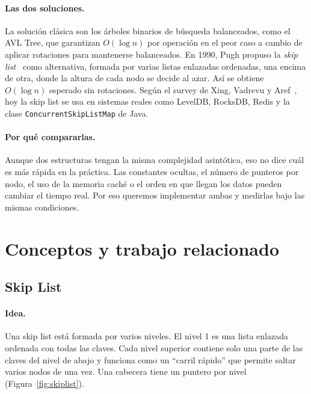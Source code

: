 \documentclass[11pt,a4paper]{article}
\begin{document}
\paragraph{Las dos soluciones.}
La solución clásica son los árboles binarios de búsqueda balanceados, como el
AVL Tree, que garantizan $O(\log n)$ por operación en el peor caso a cambio
de aplicar rotaciones para mantenerse balanceados. En 1990, Pugh propuso la
\emph{skip list}~\cite{pugh1990} como alternativa, formada por varias listas
enlazadas ordenadas, una encima de otra, donde la altura de cada nodo se decide
al azar. Así se obtiene $O(\log n)$ esperado sin rotaciones. Según el survey de
Xing, Vadrevu y Aref~\cite{vadrevu2024}, hoy la skip list se usa en sistemas
reales como LevelDB, RocksDB, Redis y la clase
\texttt{ConcurrentSkipListMap} de Java.

\paragraph{Por qué compararlas.}
Aunque dos estructuras tengan la misma complejidad asintótica, eso no dice cuál
es más rápida en la práctica. Las constantes ocultas, el número de punteros por nodo,
el uso de la memoria caché o el orden en que llegan los datos pueden cambiar el
tiempo real. Por eso queremos implementar ambas y medirlas bajo las mismas condiciones.


\section{Conceptos y trabajo relacionado}\label{sec:conceptos}

\subsection{Skip List}

\paragraph{Idea.}
Una skip list está formada por varios niveles. El nivel 1 es una lista enlazada
ordenada con todas las claves. Cada nivel superior contiene solo una parte de
las claves del nivel de abajo y funciona como un ``carril rápido'' que permite
saltar varios nodos de una vez. Una cabecera tiene un puntero por nivel
(Figura~\ref{fig:skiplist}).
\end{document}
